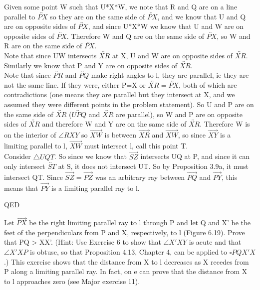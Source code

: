 \documentclass[12pt,letterpaper]{article}
\newcommand{\QED}{\begin{flushright}QED\end{flushright}}
\newcommand{\prob}[1]{\newpage\noindent {\bf #1}}
\begin{document}
Given some point W such that U*X*W, we note that R and Q are on a line parallel to $\overleftrightarrow{PX}$ so they are on the same side of $\overleftrightarrow{PX}$, and we know that U and Q are on opposite sides of $\overleftrightarrow{PX}$, and since U*X*W we know that U and W are on opposite sides of $\overleftrightarrow{PX}$.  Therefore W and Q are on the same side of $\overleftrightarrow{PX}$, so W and R are on the same side of $\overleftrightarrow{PX}$.  \\

Note that since UW intersects $\overleftrightarrow{XR}$ at X, U and W are on opposite sides of $\overleftrightarrow{XR}$.  Similarly we know that P and Y are on opposite sides of $\overleftrightarrow{XR}$.  \\





Note that since $\overleftrightarrow{PR}$ and $\overleftrightarrow{PQ}$ make right angles to l, they are parallel, ie they are not the same line.  If they were, either P=X or $\overleftrightarrow{XR} = \overleftrightarrow{PX}$, both of which are contradictions (one means they are parallel but they intersect at X, and we assumed they were different points in the problem statement). So U and P are on the same side of $\overleftrightarrow{XR}$ ($\overleftrightarrow{UPQ}$ and $\overleftrightarrow{XR}$ are parallel), so W and P are on opposite sides of $\overleftrightarrow{XR}$ and therefore W and Y are on the same side of $\overleftrightarrow{XR}$.  Therefore W is on the interior of $\angle RXY$ so $\overrightarrow{XW}$ is between $\overrightarrow{XR}$ and $\overrightarrow{XW}$, so since $\overrightarrow{XY}$ is a limiting parallel to l, $\overrightarrow{XW}$ must intersect l, call this point T.\\


Consider $\triangle UQT$. So since we know that $\overrightarrow{SZ}$ intersects UQ at P, and since it can only intersect $\overleftrightarrow{ST}$ at S, it does not intersect UT. So by Proposition 3.9a, it must intersect QT. Since $\overrightarrow{SZ} = \overrightarrow{PZ}$ was an arbitrary ray between $\overrightarrow{PQ}$ and $\overrightarrow{PY}$, this means that $\overrightarrow{PY}$ is a limiting parallel ray to l.


\QED







\prob{8 } Let $\overrightarrow{PX}$ be the right limiting parallel ray to l through P and let Q and X' be the feet of the perpendiculars from P and X, respectively, to l (Figure 6.19).  Prove that PQ > XX'. (Hint: Use Exercise 6 to show that $\angle X'XY$ is acute and that $\angle X'XP$ is obtuse, so that Proposition 4.13, Chapter 4, can be applied to $\square PQX'X$.) This exercise shows that the distance from X to l decreases as X recedes from P along a limiting parallel ray.  In fact, on e can prove that the distance from X to l approaches zero (see Major exercise 11).
\end{document}
